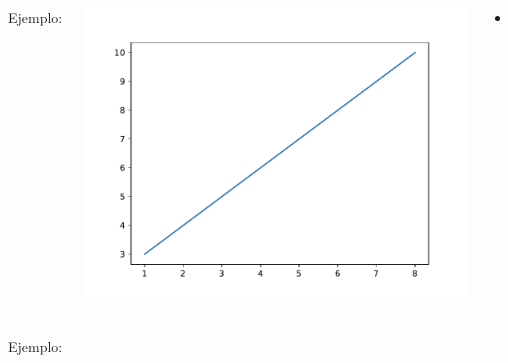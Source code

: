 \begin{frame}[fragile]
  \frametitle{}
  \begin{columns}
        \begin{exampleblock}{Ejemplo:}
          
        \end{exampleblock}
      \pausa
      \begin{center}
          \includegraphics[scale=0.4]{ejemplos/e02.pdf}
      \end{center}
      \begin{itemize}
        \item 
      \end{itemize}
  \end{columns}
\end{frame}

\begin{frame}[fragile]
  \frametitle{}

  \begin{exampleblock}{Ejemplo:}
    \begin{lstlisting}[language=Python]
    \end{lstlisting}
  \end{exampleblock}
\end{frame}

